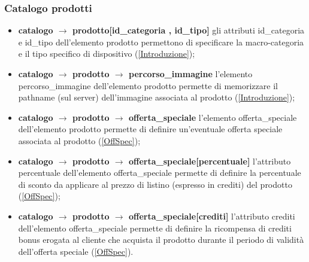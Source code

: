 \documentclass[a4paper, 14pt]{article}
\begin{document}
\begin{flushleft}
			\subsubsection{Catalogo prodotti} 
				\begin{itemize}
					\item \textbf{catalogo $\rightarrow$ prodotto[id\_categoria , id\_tipo] } gli attributi id\_categoria e id\_tipo dell'elemento prodotto permettono di specificare la macro-categoria e il tipo specifico di dispositivo (\ref{Introduzione});
					\item \textbf{catalogo $\rightarrow$ prodotto $\rightarrow$ percorso\_immagine } l'elemento percorso\_immagine dell'elemento prodotto permette di memorizzare il pathname (sul server) dell'immagine associata al prodotto
					(\ref{Introduzione});
					\item \textbf{catalogo $\rightarrow$ prodotto $\rightarrow$ offerta\_speciale } l'elemento offerta\_speciale dell'elemento prodotto permette di definire un'eventuale offerta speciale associata al prodotto
					(\ref{OffSpec});
					\item \textbf{catalogo $\rightarrow$ prodotto $\rightarrow$ offerta\_speciale[percentuale] } l'attributo percentuale dell'elemento offerta\_speciale permette di definire la percentuale di sconto da applicare al prezzo di listino (espresso in crediti) del prodotto (\ref{OffSpec});
					\item \textbf{catalogo $\rightarrow$ prodotto $\rightarrow$ offerta\_speciale[crediti] } l'attributo crediti dell'elemento offerta\_speciale permette di definire la ricompensa di crediti bonus erogata al cliente che acquista il prodotto durante il periodo di validità dell'offerta speciale (\ref{OffSpec}).
				\end{itemize}
			\smallskip
			

\end{flushleft}
\end{document}
